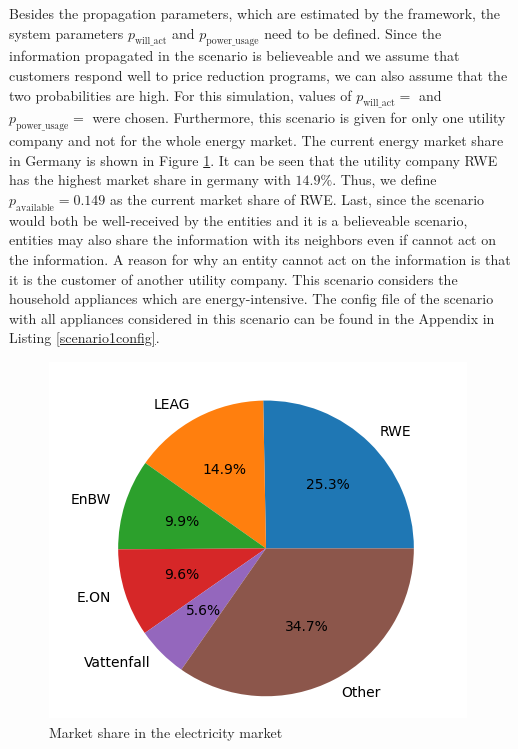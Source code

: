 Besides the propagation parameters, which are estimated by the framework,
the system parameters $p_{\mathrm{will\_act}}$ and 
$p_{\mathrm{power\_usage}}$ need to be defined. Since the information 
propagated in the scenario
is believeable and we assume that customers respond well to price 
reduction programs, we can also assume that the two probabilities are 
high. For this simulation, values of $p_{\mathrm{will\_act}}=$ and 
$p_{\mathrm{power\_usage}}=$ were chosen. Furthermore, this scenario
is given for only one utility company and not for the whole 
energy market. The current energy market share in Germany is 
shown in Figure \ref{marketshare}. It can be seen that the 
utility company RWE has the highest market share in germany 
with $14.9\%$. Thus, we define $p_{\mathrm{available}}=0.149$ as the 
current market share of RWE. Last, since the scenario would both be 
well-received by the entities and it is a believeable scenario, 
entities may also share the information with its neighbors even if
cannot act on the information. A reason for why an entity cannot act 
on the information is that it is the customer of another utility company.
This scenario considers the household appliances which are energy-intensive.
The config file of the scenario with all appliances considered in this
scenario can be found in the Appendix in Listing \ref{scenario1config}.


\begin{figure}[!ht]
    \center
    \includegraphics[scale=.95]{figs/strommarkt.png}
    \caption{Market share in the electricity market \cite{monitoringbericht}}
    \label{marketshare}
\end{figure}

